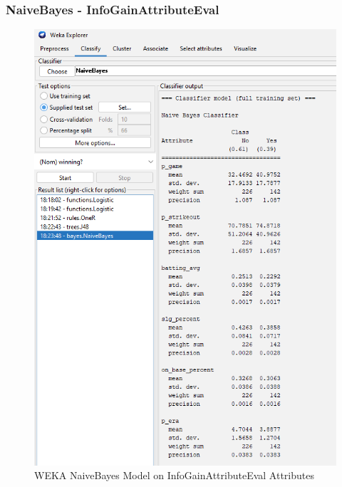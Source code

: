 \documentclass[12pt]{article}
\begin{document}
\subsubsection{NaiveBayes - InfoGainAttributeEval}
\begin{figure}[h!]
    \includegraphics[scale=0.4]{./images/InfoGainAttributeEval/NaiveBayes-Model.png}
\centering
    \caption{WEKA NaiveBayes Model on InfoGainAttributeEval Attributes}
\end{figure}
\newpage
\end{document}
